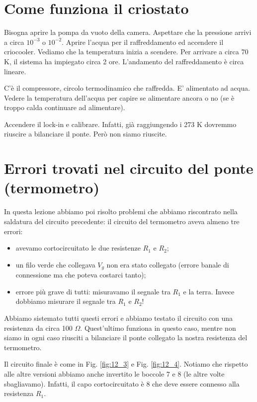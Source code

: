 \documentclass[../main/main.tex]{subfiles}
\begin{document}
\section{Come funziona il criostato}

Bisogna aprire la pompa da vuoto della camera. Aspettare che la pressione arrivi a circa \( 10^{-3} \) o \( 10^{-2} \). Aprire l'acqua per il raffreddamento ed accendere il criocooler.
Vediamo che la temperatura inizia a scendere. Per arrivare a circa 70 K, il sistema ha impiegato circa 2 ore. L'andamento del raffreddamento è circa lineare.

\begin{remark}
C'è il compressore, circolo termodinamico  che raffredda. E' alimentato ad acqua. Vedere la temperatura dell'acqua per capire se alimentare ancora o no (se è troppo calda continuare ad alimentare).
\end{remark}

Accendere il lock-in e calibrare.
Infatti, già raggiungendo i 273 K dovremmo riuscire a bilanciare il ponte. Però non siamo riuscite.

\section{Errori trovati nel circuito del ponte (termometro)}


In questa lezione abbiamo poi risolto problemi che abbiamo riscontrato nella saldatura del circuito precedente: il circuito del termometro aveva almeno tre errori:
\begin{itemize}
\item avevamo cortocircuitato le due resistenze \( R_1 \) e \( R_2 \);
\item un filo verde che collegava \( V_g \) non era stato collegato (errore banale di connessione ma che poteva costarci tanto);
\item errore più grave di tutti: misuravamo il segnale tra \( R_1 \) e la terra. Invece dobbiamo misurare il segnale tra \( R_1 \) e \( R_2 \)!
\end{itemize}
Abbiamo sistemato tutti questi errori e abbiamo testato il circuito con una resistenza da circa 100 \( \Omega  \). Quest'ultimo funziona in questo caso, mentre non siamo in ogni caso riusciti a bilanciare il ponte collegato la nostra resistenza del termometro.

Il circuito finale è come in Fig. \ref{fig:12_3} e Fig. \ref{fig:12_4}. Notiamo che rispetto alle altre versioni abbiamo anche invertito le boccole 7 e 8 (le altre volte sbagliavamo). Infatti, il capo cortocircuitato è 8 che deve essere connesso alla resistenza $R_1$.
\end{document}
